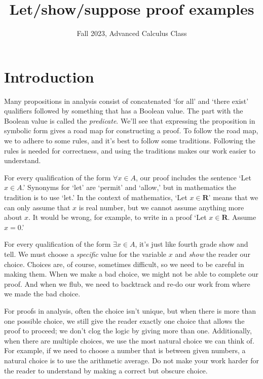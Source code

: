 \documentclass[12pt,fleqn]{article}
\title{Let/show/suppose proof examples}
\author{Fall 2023, Advanced Calculus Class}
\newcommand{\reals}{\mathbf{R}}
\newcounter{ex}\setcounter{ex}{0}
\begin{document}
\maketitle

\section{Introduction}


Many propositions in analysis consist of concatenated `for all' and `there exist'  qualifiers followed by something that has a Boolean value.  
The part with the Boolean value is called the \emph{predicate}. We'll see that expressing the proposition in symbolic 
form gives a road map for constructing  a proof. To follow the road map, we to 
adhere to some rules, and it's best to follow some traditions.  Following the rules is 
needed for correctness,  and using the traditions makes 
 our work easier to understand.

For every qualification of the form $\forall x \in A$, our proof includes the sentence `Let $x \in A$.'  Synonyms  for  `let' 
are `permit' and `allow,' but in mathematics the tradition is to use `let.' In the context of mathematics, `Let $x \in \reals$' means that we can only assume that $x$ is real number, but we cannot assume anything more about $x$. It would be wrong, for example, to write in a proof  
`Let $x \in \reals$. Assume $x = 0$.'

For every qualification of the form $\exists x \in A$, it's just like fourth grade show and tell. We must choose a \emph{specific} value for the 
variable $x$ and \emph{show} the reader our choice. Choices are, of course, sometimes difficult, so we need to be careful in making them. When we make a bad choice, we might not be able to complete our proof. 
And when we flub, we need to backtrack and re-do our work from where
we made the bad choice.

For proofs in analysis, often the choice isn't unique, but when there is more than one possible choice,
we still give the reader exactly one choice that allows the proof to proceed; we don't clog the logic by giving more than one.
Additionally, when there are multiple choices, we use the most natural choice we can think of. For example, if we need to choose a number that is between
given numbers, a natural choice is to use the arithmetic average. Do not make your work harder for the reader to understand 
by making a correct but obscure choice.
\end{document}
